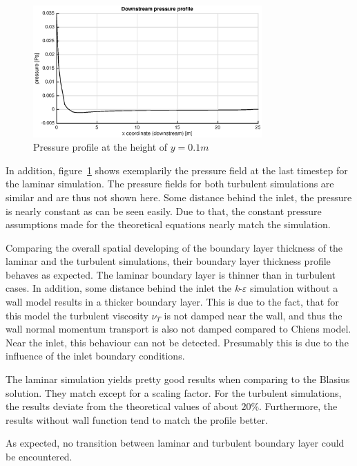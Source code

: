 \begin{figure}[!htb]
\centering
\includegraphics[width=0.78\textwidth]{FIGURES/pressure.eps}
\caption{Pressure profile at the height of $y=0.1m$}
\label{fig:boundarylayerpressure}
\end{figure} 

\noii In addition, figure~\ref{fig:boundarylayerpressure} shows exemplarily the pressure field at the last timestep for the laminar simulation. The pressure fields for both turbulent simulations are similar and are thus not shown here. Some distance behind the inlet, the pressure is nearly constant as can be seen easily. Due to that, the constant pressure assumptions made for the theoretical equations nearly match the simulation.

\noii Comparing the overall spatial developing of the boundary layer thickness of the laminar and the turbulent simulations, their boundary layer thickness profile behaves as expected. The laminar boundary layer is thinner than in turbulent cases. In addition, some distance behind the inlet the \textit{k}-$\varepsilon$ simulation without a wall model results in a thicker boundary layer. This is due to the fact, that for this model the turbulent viscosity $\nu_T$ is not damped near the wall, and thus the wall normal momentum transport is also not damped compared to Chiens model. Near the inlet, this behaviour can not be detected. Presumably this is due to the influence of the inlet boundary conditions.

\noii The laminar simulation yields pretty good results when comparing to the Blasius solution. They match except for a scaling factor. For the turbulent simulations, the results deviate from the theoretical values of about $20\%$. Furthermore, the results without wall function tend to match the profile better.

\noii As expected, no transition between laminar and turbulent boundary layer could be encountered.


